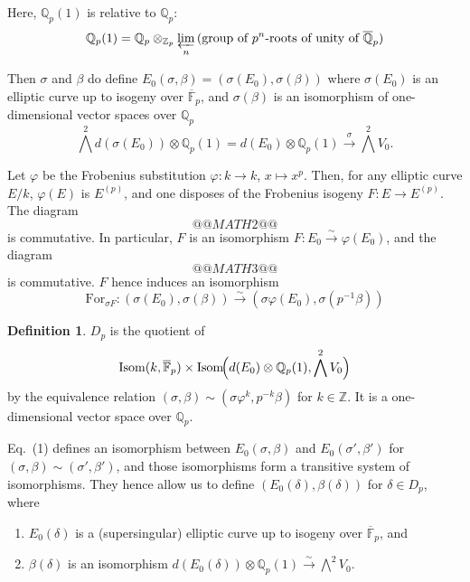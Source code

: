 \documentclass[11pt,a4paper]{article}
\theoremstyle{plain}
\theoremstyle{definition}
\newtheorem{definition}[theorem]{Definition}
\theoremstyle{remark}
\DeclareMathOperator{\Isom}{Isom}
\newcommand{\Z}{\mathbb{Z}}
\newcommand{\Qpbar}{\overline{\mathbb{Q}}_{p}}
\newcommand{\Fpbar}{\overline{\mathbb{F}}_{p}}
\newcommand{\Zp}{\mathbb{Z}_{p}}
\newcommand{\Qp}{\mathbb{Q}_{p}}
\begin{document}
Here, $\Qp(1)$ is relative to $\Qp$:
\[
\Qp(1) = \Qp \otimes_{\Zp} \varprojlim_{n} \text{(group of $p^{n}$-roots of unity of $\Qpbar$)}
\]

Then $\sigma$ and $\beta$ do define $E_{0}(\sigma, \beta) = (\sigma(E_{0}), \sigma(\beta))$ where $\sigma(E_{0})$ is an elliptic curve up to isogeny over $\Fpbar$, and $\sigma(\beta)$ is an isomorphism of one-dimensional vector spaces over $\Qp$
\[
\bigwedge^{2} d(\sigma(E_{0})) \otimes \Qp(1) = d(E_{0}) \otimes \Qp(1) \xrightarrow{\sigma} \bigwedge^{2} V_{0}.
\]

Let $\varphi$ be the Frobenius substitution $\varphi : k \to k$, $x \mapsto x^{p}$. Then, for any elliptic curve $E/k$, $\varphi(E)$ is $E^{(p)}$, and one disposes of the Frobenius isogeny $F : E \to E^{(p)}$.
The diagram
\[
@@MATH2@@
\]
is commutative. In particular, $F$ is an isomorphism $F : E_{0} \xrightarrow{\sim} \varphi(E_{0})$, and the diagram
\[
@@MATH3@@
\]
is commutative. $F$ hence induces an isomorphism
\[
\mathrm{For}_{\sigma F} : (\sigma(E_{0}), \sigma(\beta)) \xrightarrow{\sim} (\sigma\varphi(E_{0}), \sigma(p^{-1}\beta))
\tag{1}
\]

\begin{definition}
$D_{p}$ is the quotient of
\[
\Isom(k, \Fpbar) \times \Isom\!\Bigl(d(E_{0}) \otimes \Qp(1), \bigwedge^{2} V_{0}\Bigr)
\]
by the equivalence relation $(\sigma, \beta) \sim (\sigma\varphi^{k}, p^{-k}\beta)$ for $k \in \Z$. It is a one-dimensional vector space over $\Qp$.
\end{definition}

Eq.\ (1) defines an isomorphism between $E_{0}(\sigma, \beta)$ and $E_{0}(\sigma', \beta')$ for $(\sigma, \beta) \sim (\sigma', \beta')$, and those isomorphisms form a transitive system of isomorphisms. They hence allow us to define $(E_{0}(\delta), \beta(\delta))$ for $\delta \in D_{p}$, where
\begin{enumerate}[label=(\alph*)]
\item $E_{0}(\delta)$ is a (supersingular) elliptic curve up to isogeny over $\Fpbar$, and
\item $\beta(\delta)$ is an isomorphism $d(E_{0}(\delta)) \otimes \Qp(1) \xrightarrow{\sim} \bigwedge^{2} V_{0}$.
\end{enumerate}
\end{document}
